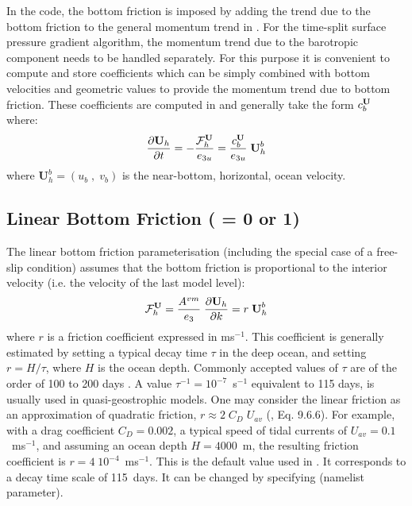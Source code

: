 In the code, the bottom friction is imposed by adding the trend due to the bottom 
friction to the general momentum trend in . For the time-split surface 
pressure gradient algorithm, the momentum trend due to the barotropic component 
needs to be handled separately. For this purpose it is convenient to compute and 
store coefficients which can be simply combined with bottom velocities and geometric 
values to provide the momentum trend due to bottom friction. 
These coefficients are computed in  and generally take the form 
$c_b^{\textbf U}$ where:
\begin{equation} \label{Eq_zdfbfr_bdef}
\frac{\partial {\textbf U_h}}{\partial t} = 
  - \frac{{\cal F}^{\textbf U}_{h}}{e_{3u}} = \frac{c_b^{\textbf U}}{e_{3u}} \;{\textbf U}_h^b
\end{equation}
where $\textbf{U}_h^b = (u_b\;,\;v_b)$ is the near-bottom, horizontal, ocean velocity.

\subsection{Linear Bottom Friction ( = 0 or 1) }
\label{ZDF_bfr_linear}

The linear bottom friction parameterisation (including the special case 
of a free-slip condition) assumes that the bottom friction 
is proportional to the interior velocity (i.e. the velocity of the last 
model level):
\begin{equation} \label{Eq_zdfbfr_linear}
{\cal F}_h^\textbf{U} = \frac{A^{vm}}{e_3} \; \frac{\partial \textbf{U}_h}{\partial k} = r \; \textbf{U}_h^b
\end{equation}
where $r$ is a friction coefficient expressed in ms$^{-1}$. 
This coefficient is generally estimated by setting a typical decay time 
$\tau$ in the deep ocean, 
and setting $r = H / \tau$, where $H$ is the ocean depth. Commonly accepted 
values of $\tau$ are of the order of 100 to 200 days \citep{Weatherly_JMR84}. 
A value $\tau^{-1} = 10^{-7}$~s$^{-1}$ equivalent to 115 days, is usually used 
in quasi-geostrophic models. One may consider the linear friction as an 
approximation of quadratic friction, $r \approx 2\;C_D\;U_{av}$ (\citet{Gill1982}, 
Eq. 9.6.6). For example, with a drag coefficient $C_D = 0.002$, a typical speed 
of tidal currents of $U_{av} =0.1$~m\;s$^{-1}$, and assuming an ocean depth 
$H = 4000$~m, the resulting friction coefficient is $r = 4\;10^{-4}$~m\;s$^{-1}$. 
This is the default value used in \NEMO. It corresponds to a decay time scale 
of 115~days. It can be changed by specifying  (namelist parameter).

